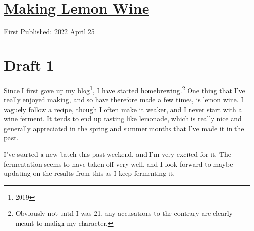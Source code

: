 \documentclass[12pt]{article}[titlepage]
\newcommand{\1}{\={a}}
\newcommand{\2}{\={e}}
\newcommand{\3}{\={\i}}
\newcommand{\4}{\=o}
\newcommand{\5}{\=u}
\newcommand{\6}{\={A}}
\renewcommand{\,}{\textsuperscript{,}}
\begin{document}
\doublespacing
\section{\href{making-lemon-wine.tex}{Making Lemon Wine}}
First Published: 2022 April 25


\section{Draft 1}
Since I first gave up my blog\footnote{2019}, I have started homebrewing.\footnote{Obviously not until I was 21, any accusations to the contrary are clearly meant to malign my character.}
One thing that I've really enjoyed making, and so have therefore made a few times, is lemon wine.
I vaguely follow a \href{https://skeeterpee.com/recipe}{recipe}, though I often make it weaker, and I never start with a wine ferment.
It tends to end up tasting like lemonade, which is really nice and generally appreciated in the spring and summer months that I've made it in the past.

I've started a new batch this past weekend, and I'm very excited for it.
The fermentation seems to have taken off very well, and I look forward to maybe updating on the results from this as I keep fermenting it.
\end{document}

